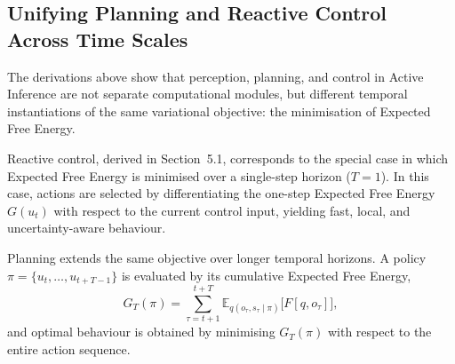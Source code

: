 \documentclass[a4paper, twoside]{article}
\begin{document}







\subsection{Unifying Planning and Reactive Control Across Time Scales}

The derivations above show that perception, planning, and control in Active Inference
are not separate computational modules, but different temporal instantiations of the
same variational objective: the minimisation of Expected Free Energy.

Reactive control, derived in Section~5.1, corresponds to the special case in which
Expected Free Energy is minimised over a single-step horizon ($T = 1$). In this case,
actions are selected by differentiating the one-step Expected Free Energy $G(u_t)$
with respect to the current control input, yielding fast, local, and uncertainty-aware
behaviour.

Planning extends the same objective over longer temporal horizons. A policy
$\pi = \{u_t, \ldots, u_{t+T-1}\}$ is evaluated by its cumulative Expected Free Energy,
\begin{equation}
G_T(\pi) =
\sum_{\tau=t+1}^{t+T}
\mathbb{E}_{q(o_\tau, s_\tau \mid \pi)} \big[ F[q, o_\tau] \big],
\end{equation}
and optimal behaviour is obtained by minimising $G_T(\pi)$ with respect to the entire
action sequence.
\end{document}
